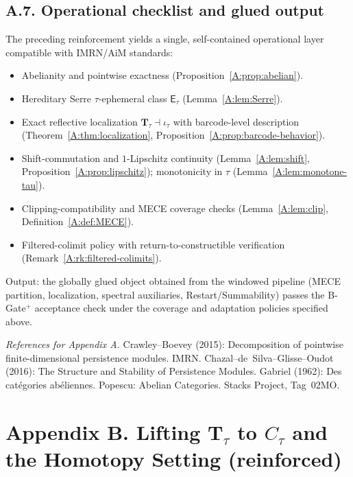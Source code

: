 \documentclass[11pt]{article}
\numberwithin{equation}{section}
\theoremstyle{plain}
\theoremstyle{definition}
\theoremstyle{remark}
\theoremstyle{plain}
\theoremstyle{definition}
\numberwithin{equation}{section}
\theoremstyle{definition}
\numberwithin{equation}{section}
\theoremstyle{plain}
\theoremstyle{definition}
\theoremstyle{remark}
\begin{document}
\subsection*{A.7. Operational checklist and glued output}
The preceding reinforcement yields a single, self-contained operational layer compatible with IMRN/AiM standards:
\begin{itemize}
  \item Abelianity and pointwise exactness (Proposition~\ref{A:prop:abelian}).
  \item Hereditary Serre \(\tau\)-ephemeral class \(\mathsf{E}_\tau\) (Lemma~\ref{A:lem:Serre}).
  \item Exact reflective localization \(\mathbf{T}_\tau\dashv\iota_\tau\) with barcode-level description (Theorem~\ref{A:thm:localization}, Proposition~\ref{A:prop:barcode-behavior}).
  \item Shift-commutation and \(1\)-Lipschitz continuity (Lemma~\ref{A:lem:shift}, Proposition~\ref{A:prop:lipschitz}); monotonicity in \(\tau\) (Lemma~\ref{A:lem:monotone-tau}).
  \item Clipping-compatibility and MECE coverage checks (Lemma~\ref{A:lem:clip}, Definition~\ref{A:def:MECE}).
  \item Filtered-colimit policy with return-to-constructible verification (Remark~\ref{A:rk:filtered-colimits}).
\end{itemize}
Output: the globally glued object obtained from the windowed pipeline (MECE partition, localization, spectral auxiliaries, Restart/Summability) passes the B-Gate\(^{+}\) acceptance check under the coverage and adaptation policies specified above.

\medskip
\noindent\emph{References for Appendix A.}
Crawley–Boevey (2015): Decomposition of pointwise finite-dimensional persistence modules. IMRN. 
Chazal–de~Silva–Glisse–Oudot (2016): The Structure and Stability of Persistence Modules. 
Gabriel (1962): Des catégories abéliennes. 
Popescu: Abelian Categories. 
Stacks Project, Tag~02MO.

\endgroup



\appendix
\section*{Appendix B. Lifting \texorpdfstring{$\mathbf{T}_\tau$}{T\_\tau} to \texorpdfstring{$C_\tau$}{C\_\tau} and the Homotopy Setting (reinforced)}
\end{document}
